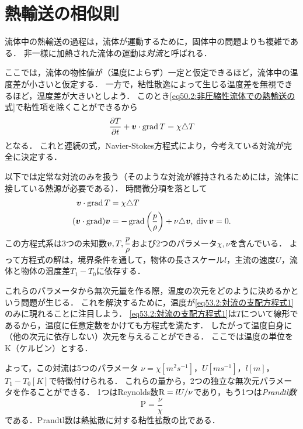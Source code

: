 \section{熱輸送の相似則}

流体中の熱輸送の過程は，流体が運動するために，固体中の問題よりも複雑である．
非一様に加熱された流体の運動は\emph{対流}と呼ばれる．



ここでは，流体の物性値が（温度によらず）一定と仮定できるほど，流体中の温度差が小さいと仮定する．
一方で，粘性散逸によって生じる温度差を無視できるほど，温度差が大きいとしよう．
このとき\eqref{eq50.2:非圧縮性流体での熱輸送の式}で粘性項を除くことができるから
\begin{equation}\label{eq53.1:粘性なしの非圧縮性流体での熱輸送の式}
    \pdv{T}{t} + \vb*{v} \cdot \operatorname{grad} T = \chi \triangle T 
\end{equation}
となる．
これと連続の式，Navier-Stokes方程式により，今考えている対流が完全に決定する．


以下では定常な対流のみを扱う（そのような対流が維持されるためには，流体に接している熱源が必要である）．
時間微分項を落として
\begin{align}
    \vb*{v} \cdot \operatorname{grad} T &= \chi \triangle T \label{eq53.2:対流の支配方程式1} \\
    (\vb*{v} \cdot \operatorname{grad}) \vb*{v} &= - \operatorname{grad} \left( \frac{p}{\rho} \right) + \nu \triangle \vb*{v}, \;
    \operatorname{div} \vb*{v} = 0. \label{eq53.3:対流の支配方程式2}
\end{align}
この方程式系は3つの未知数$\vb*{v}, T, \dfrac{p}{\rho}$および2つのパラメータ$\chi, \nu$を含んでいる．
よって方程式の解は，境界条件を通して，物体の長さスケール$l$，主流の速度$U$，流体と物体の温度差$T_1-T_0$に依存する．

これらのパラメータから無次元量を作る際，温度の次元をどのように決めるかという問題が生じる．
これを解決するために，温度が\eqref{eq53.2:対流の支配方程式1}のみに現れることに注目しよう．
\eqref{eq53.2:対流の支配方程式1}は$T$について線形であるから，温度に任意定数をかけても方程式を満たす．
したがって温度自身に（他の次元に依存しない）次元を与えることができる．
ここでは温度の単位をK（ケルビン）とする．




よって，この対流は5つのパラメータ
$\nu=\chi [\si{m^2s^{-1}}]$，$U[\si{m s^{-1}}]$，$l[\si{m}]$，$T_1-T_0[\si{K}]$で特徴付けられる．
これらの量から，2つの独立な無次元パラメータを作ることができる．
1つはReynolds数$\mathrm{R} = lU/\nu$であり，もう1つは\emph{Prandtl数}
\begin{equation}
    \mathrm{P} = \frac{\nu}{\chi}
\end{equation}
である．Prandtl数は熱拡散に対する粘性拡散の比である．

